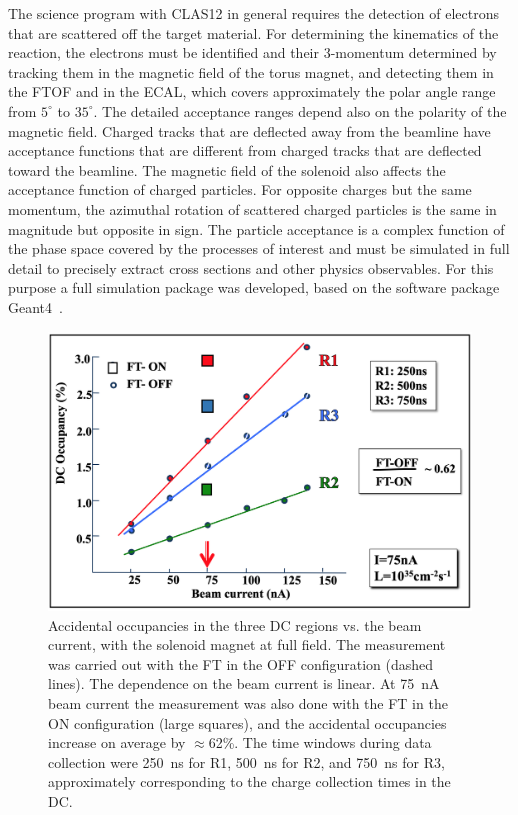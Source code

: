 \documentclass[final,3p,twocolumn]{elsarticle}
\begin{document}
The science program with CLAS12 in general requires the detection of electrons that are scattered off the target
material. For determining the kinematics of the reaction, the electrons must be identified and their 3-momentum
determined by tracking them in the magnetic field of the torus magnet, and detecting them in the FTOF and in the
ECAL, which covers approximately the polar angle range from $5^\circ$ to $35^\circ$. The detailed acceptance
ranges depend also on the polarity of the magnetic field. Charged tracks that are deflected away from the beamline
have acceptance functions that are different from charged tracks that are deflected toward the beamline. The
magnetic field of the solenoid also affects the acceptance function of charged particles. For opposite charges but
the same momentum, the azimuthal rotation of scattered charged particles is the same in magnitude but opposite in
sign. The particle acceptance is a complex function of the phase space covered by the processes of interest and 
must be simulated in full detail to precisely extract cross sections and other physics observables.  For this purpose 
a full simulation package was developed, based on the software package Geant4~\cite{GEMC}. 

\begin{figure}[htbp!]
\centerline{\includegraphics[width=1.0\columnwidth]{random-occupancies.png}}
\caption{Accidental occupancies in the three DC regions vs. the beam current, with the solenoid magnet at full field.
  The measurement was carried out with the FT in the OFF configuration (dashed lines). The dependence on the beam
  current is linear. At 75~nA beam current the measurement was also done with the FT in the ON configuration (large
  squares), and the accidental occupancies increase on average by $\approx$62\%. The time windows during data
  collection were 250~ns for R1, 500~ns for R2, and 750~ns for R3, approximately corresponding to the charge
  collection times in the DC.}
\label{occupancies1}
\end{figure}
\end{document}
